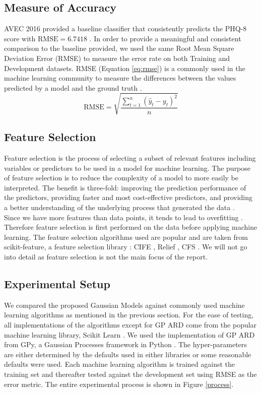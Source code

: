 \documentclass{article}
\begin{document}
 	\subsection{Measure of Accuracy}
	AVEC 2016 provided a baseline classifier that consistently predicts the PHQ-8 score with $\text{RMSE}=6.7418$ \cite{avec2016}. 
	In order to provide a meaningful and consistent comparison to the baseline provided, we used the same Root Mean Square Deviation Error (RMSE) to measure the error rate on both Training and Development datasets. 
	RMSE (Equation \ref{eq:rmse}) is a commonly used in the machine learning community to measure the differences between the values predicted by a model 
	and the ground truth \cite{Dhanani:EECS-2014-131}. 
	\begin{equation}\label{eq:rmse}
  	\text{RMSE} = \sqrt{\frac{\sum_{t=1}^n (\hat y_t - y_t)^2}{n}}
 	\end{equation} 

	\subsection{Feature Selection}
	Feature selection is the process of selecting a subset of relevant features including variables or predictors to be used in a model for machine learning. 
	The purpose of feature selection is to reduce the complexity of a model to more easily be interpreted. 
	The benefit is three-fold: improving the prediction performance of the predictors, providing faster and most cost-effective predictors, 
	and providing a better understanding of the underlying process that generated the data \cite{Guyon2003}.\\
	
Since we have more features than data points, it tends to lead to overfitting \cite{Smith2011}. Therefore feature selection is first performed on the data before applying machine learning. 
	The feature selection algorithms used are popular and are taken from scikit-feature, a feature selection library \cite{li2016feature}: CIFE \cite{Lin2006}, Relief \cite{Rob2003}, CFS \cite{HALLHALL}. 
	We will not go into detail as feature selection is not the main focus of the report.
	
	\subsection{Experimental Setup}
	We compared the proposed Gaussian Models against commonly used machine learning algorithms as mentioned in the previous section. 
	For the ease of testing, all implementations of the algorithms except for GP ARD come from the popular machine learning library, Scikit Learn \cite{scikit-learn}. 
	We used the implementation of GP ARD from GPy, a Gaussian Processes framework in Python \cite{gpy2014}.
	The hyper-parameters are either determined by the defaults used in either libraries or some reasonable defaults were used.
	Each machine learning algorithm is trained against the training set and thereafter tested against the development set using RMSE as the error metric. 
	The entire experimental process is shown in Figure \ref{process}. \\
 
\end{document}
